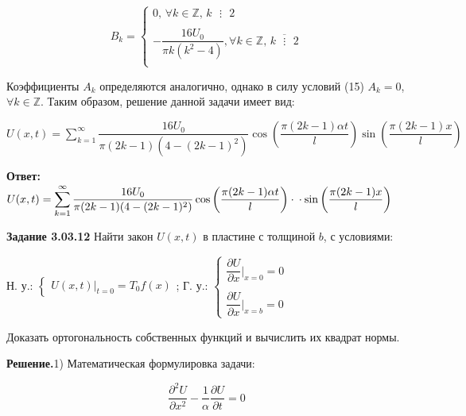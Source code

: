 \documentclass[a4paper, 12pt]{article}
\begin{document}
	\begin{equation}
		B_k = \begin{cases}
			0\text{, } \forall k  \in \mathbb{Z}\text{, } k \text{ } \vdots\text{ } 2\\
			\\
			-\dfrac{16U_0}{\pi k (k^2 - 4)}, \forall k  \in \mathbb{Z}\text{, } \overline{k \text{ } \vdots\text{ } 2}\\
		\end{cases}
	\end{equation}
	
	\quad Коэффициенты $A_k$ определяются аналогично, однако в силу условий (15) $A_k = 0$, $\forall k \in \mathbb{Z}$. Таким образом, решение данной задачи имеет вид:
	
	\begin{center}
		$U(x, t) = \displaystyle\sum\limits_{k=1}^{\infty }\dfrac{16U_0}{\pi (2k-1) (4 - (2k-1)^2)} \cos\left(\dfrac{\pi (2k-1) \alpha t}{l}\right) \sin\left(\dfrac{\pi (2k-1) x}{l}\right) $
	\end{center}
	
	\quad \textbf{Ответ:} $U(x, t) = \displaystyle\sum\limits_{k=1}^{\infty }\dfrac{16U_0}{\pi (2k-1) (4 - (2k-1)^2)} \cos\left(\dfrac{\pi (2k-1) \alpha t}{l}\right) \cdot \newline \cdot \sin\left(\dfrac{\pi (2k-1) x}{l}\right) $
	
	\newpage
	
	\quad \textbf{Задание 3.03.12} Найти закон $U(x, t)$ в пластине с толщиной $b$, с условиями: 
	
	\begin{center}
		Н. у.: $\begin{cases}
			U(x, t)\bigg|_{t = 0} = T_0 f(x)
		\end{cases}$; Г. у.: $\begin{cases}
			\dfrac{\partial U}{\partial x} \bigg|_{x = 0} = 0\\
			\\
			\dfrac{\partial U}{\partial x} \bigg|_{x = b} = 0
		\end{cases}$
	\end{center}
	
	\quad Доказать ортогональность собственных функций и вычислить их квадрат нормы. 
	
	\quad \textbf{Решение.}1) Математическая формулировка задачи: 
	
	\begin{equation}
		\dfrac{\partial^2 U}{\partial x^2} - \dfrac{1}{\alpha} \dfrac{\partial U}{\partial t} = 0
	\end{equation}
	
\end{document}
